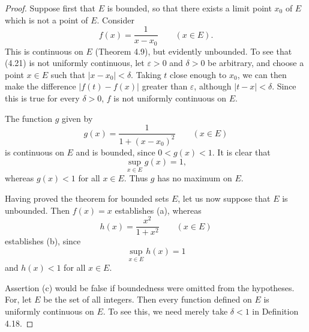 \begin{proof}
Suppose first that $E$ is bounded, so that there exists a limit point $x_0$
of $E$ which is not a point of $E$. Consider
\begin{equation}
  f(x) = \frac{1}{x-x_0} \qquad (x \in E). \tag{4.21}
\end{equation}
This is continuous on $E$ (Theorem 4.9), but evidently unbounded. To see that
(4.21) is not uniformly continuous, let $\varepsilon > 0$ and $\delta > 0$ be
arbitrary, and choose a point $x \in E$ such that $|x-x_0| < \delta$. Taking
$t$ close enough to $x_0$, we can then make the difference $|f(t)-f(x)|$
greater than $\varepsilon$, although $|t-x| < \delta$. Since this is true for
every $\delta > 0$, $f$ is not uniformly continuous on $E$.

The function $g$ given by
\begin{equation}
  g(x) = \frac{1}{1+(x-x_0)^2} \qquad (x \in E) \tag{4.22}
\end{equation}
is continuous on $E$ and is bounded, since $0 < g(x) < 1$. It is clear that
\[ \sup_{x\in E} g(x) = 1, \]
whereas $g(x) < 1$ for all $x \in E$. Thus $g$ has no maximum on $E$.

Having proved the theorem for bounded sets $E$, let us now suppose that $E$
is unbounded. Then $f(x) = x$ establishes (a), whereas
\begin{equation}
  h(x) = \frac{x^2}{1+x^2} \qquad (x \in E) \tag{4.23}
\end{equation}
establishes (b), since
\[ \sup_{x\in E} h(x) = 1 \]
and $h(x) < 1$ for all $x \in E$.

Assertion (c) would be false if boundedness were omitted from the
hypotheses. For, let $E$ be the set of all integers. Then every function
defined on $E$ is uniformly continuous on $E$. To see this, we need merely
take $\delta < 1$ in Definition 4.18.
\end{proof}

